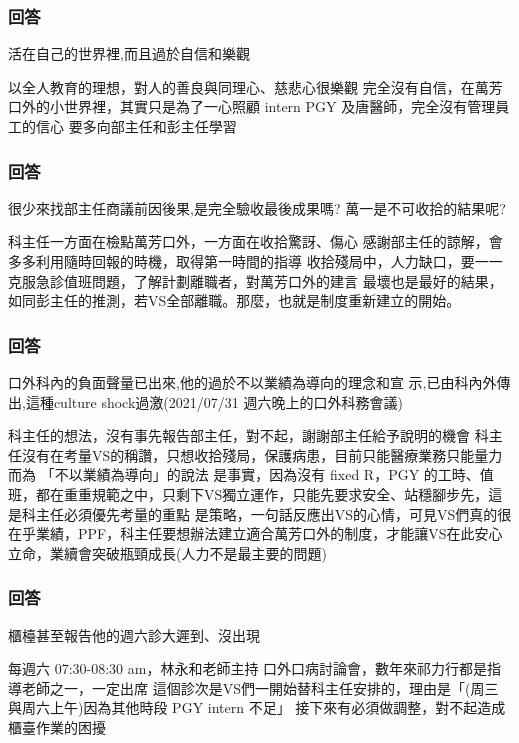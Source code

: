 \documentclass[t,24pt,aspectratio=169]{beamer}
\begin{document}



\begin{frame}[hoved]
\frametitle{回答}
活在自己的世界裡,而且過於自信和樂觀

\begin{outline}
\1 以全人教育的理想，對人的善良與同理心、慈悲心很樂觀
\1 完全沒有自信，在萬芳口外的小世界裡，其實只是為了一心照顧 intern PGY 及唐醫師，完全沒有管理員工的信心
\1 要多向部主任和彭主任學習
\end{outline}

\end{frame}

\begin{frame}[hoved]
\frametitle{回答}
很少來找部主任商議前因後果,是完全驗收最後成果嗎?
萬一是不可收拾的結果呢?
\begin{outline}
\1 科主任一方面在檢點萬芳口外，一方面在收拾驚訝、傷心
\1 感謝部主任的諒解，會多多利用隨時回報的時機，取得第一時間的指導
\1 收拾殘局中，人力缺口，要一一克服急診值班問題，了解計劃離職者，對萬芳口外的建言
\1 最壞也是最好的結果，如同彭主任的推測，若VS全部離職。那麼，也就是制度重新建立的開始。
\end{outline}

\end{frame}

\begin{frame}[hoved]
\frametitle{回答}
口外科內的負面聲量已出來,他的過於不以業績為導向的理念和宣
示,已由科內外傳出,這種culture shock過激(2021/07/31 週六晚上的口外科務會議) 
\begin{outline}
\1 科主任的想法，沒有事先報告部主任，對不起，謝謝部主任給予說明的機會
\1 科主任沒有在考量VS的稱讚，只想收拾殘局，保護病患，目前只能醫療業務只能量力而為
\1 「不以業績為導向」的說法
    \2 是事實，因為沒有 fixed R，PGY 的工時、值班，都在重重規範之中，只剩下VS獨立運作，只能先要求安全、站穩腳步先，這是科主任必須優先考量的重點
    \2 是策略，一句話反應出VS的心情，可見VS們真的很在乎業績，PPF，科主任要想辦法建立適合萬芳口外的制度，才能讓VS在此安心立命，業續會突破瓶頸成長(人力不是最主要的問題)

\end{outline}

\end{frame}

\begin{frame}[hoved]
\frametitle{回答}
櫃檯甚至報告他的週六診大遲到、沒出現
\begin{outline}
\1 每週六 07:30-08:30 am，林永和老師主持 口外口病討論會，數年來祁力行都是指導老師之一，一定出席
    \2 這個診次是VS們一開始替科主任安排的，理由是「(周三與周六上午)因為其他時段 PGY intern 不足」
    \2 接下來有必須做調整，對不起造成櫃臺作業的困擾

\end{outline}


\end{frame}
\end{document}
